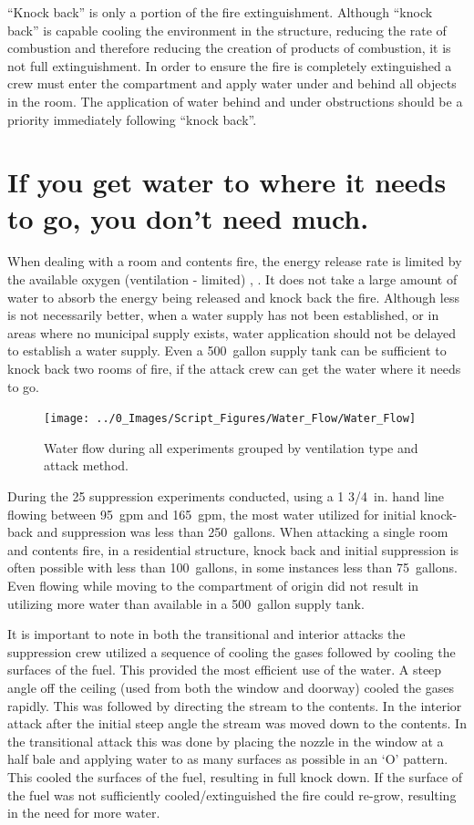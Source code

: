 \documentclass[12pt,oneside]{book}
\begin{document}
``Knock back'' is only a portion of the fire extinguishment. Although ``knock back'' is capable cooling the environment in the structure, reducing the rate of combustion and therefore reducing the creation of products of combustion, it is not full extinguishment. In order to ensure the fire is completely extinguished a crew must enter the compartment and apply water under and behind all objects in the room. The application of water behind and under obstructions should be a priority immediately following ``knock back''.  

\section{If you get water to where it needs to go, you don't need much.} \label{tc:water_where_it_needs_to_go}
When dealing with a room and contents fire, the energy release rate is limited by the available oxygen (ventilation - limited) \cite{DHS2008}, \cite{DHS2010}. It does not take a large amount of water to absorb the energy being released and knock back the fire. Although less is not necessarily better, when a water supply has not been established, or in areas where no municipal supply exists, water application should not be delayed to establish a water supply. Even a 500~gallon supply tank can be sufficient to knock back two rooms of fire, if the attack crew can get the water where it needs to go.    

\begin{figure}[H]
\centering
\texttt{[image: ../0\_Images/Script\_Figures/Water\_Flow/Water\_Flow]}
\caption[Water Flow All Experiments]{Water flow during all experiments grouped by ventilation type and attack method.}
\label{fig:water_amount_TC_all}
\end{figure}

During the 25 suppression experiments conducted, using a 1 3/4~in. hand line flowing between 95~gpm and 165~gpm, the most water utilized for initial knock-back and suppression was less than 250~gallons. When attacking a single room and contents fire, in a residential structure, knock back and initial suppression is often possible with less than 100~gallons, in some instances less than 75~gallons. Even flowing while moving to the compartment of origin did not result in utilizing more water than available in a 500~gallon supply tank.  

It is important to note in both the transitional and interior attacks the suppression crew utilized a sequence of cooling the gases followed by cooling the surfaces of the fuel. This provided the most efficient use of the water. A steep angle off the ceiling (used from both the window and doorway) cooled the gases rapidly. This was followed by directing the stream to the contents. In the interior attack after the initial steep angle the stream was moved down to the contents. In the transitional attack this was done by placing the nozzle in the window at a half bale and applying water to as many surfaces as possible in an `O' pattern. This cooled the surfaces of the fuel, resulting in full knock down. If the surface of the fuel was not sufficiently cooled/extinguished the fire could re-grow, resulting in the need for more water.
\end{document}
